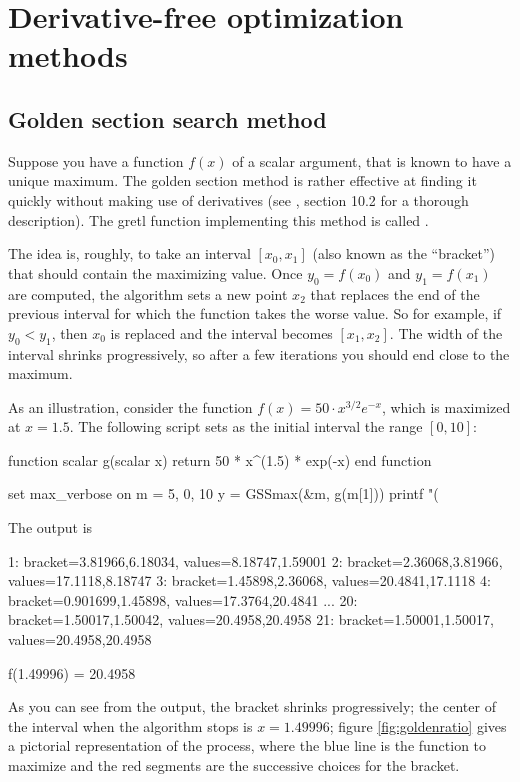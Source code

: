 \section{Derivative-free optimization methods}
\label{sec:derivfree}

\subsection{Golden section search method}
\label{sec:golden}

Suppose you have a function $f(x)$ of a scalar argument, that is known
to have a unique maximum. The golden section method is rather effective
at finding it quickly without making use of derivatives (see
\cite{pressetal2007}, section 10.2 for a thorough description). The
gretl function implementing this method is called .

The idea is, roughly, to take an interval $[x_0, x_1]$ (also known as
the ``bracket'') that should contain the maximizing value. Once
$y_0 = f(x_0)$ and $y_1 = f(x_1)$ are computed, the algorithm sets a
new point $x_2$ that replaces the end of the previous interval for
which the function takes the worse value. So for example, if
$y_0 < y_1$, then $x_0$ is replaced and the interval becomes
$[x_1, x_2]$. The width of the interval shrinks progressively, so
after a few iterations you should end close to the maximum.

As an illustration, consider the function $f(x) = 50 \cdot x^{3/2}
e^{-x}$, which is maximized at $x = 1.5$. The following script sets as
the initial interval the range $[0, 10]$:
\begin{scode}
function scalar g(scalar x)
    return 50 * x^(1.5) * exp(-x)
end function

set max_verbose on
m = {5, 0, 10}
y = GSSmax(&m, g(m[1]))
printf "\nf(%
\end{scode}

The output is
\begin{code}
1: bracket={3.81966,6.18034}, values={8.18747,1.59001}
2: bracket={2.36068,3.81966}, values={17.1118,8.18747}
3: bracket={1.45898,2.36068}, values={20.4841,17.1118}
4: bracket={0.901699,1.45898}, values={17.3764,20.4841}
...
20: bracket={1.50017,1.50042}, values={20.4958,20.4958}
21: bracket={1.50001,1.50017}, values={20.4958,20.4958}

f(1.49996) = 20.4958
\end{code}

As you can see from the output, the bracket shrinks progressively; the
center of the interval when the algorithm stops is $x=1.49996$;
figure \ref{fig:goldenratio} gives a pictorial representation of the
process, where the blue line is the function to maximize and the red
segments are the successive choices for the bracket.

